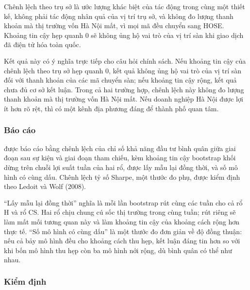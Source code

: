 Chênh lệch theo trụ sở là ước lượng khác biệt của tác động trong cùng một thiết kế, không phải tác động nhân quả của vị trí trụ sở, và không đo lượng thanh khoản mà thị trường vốn Hà Nội mất, vì mọi mã đều chuyển sang HOSE. Khoảng tin cậy hẹp quanh 0 sẽ không ủng hộ vai trò của vị trí sàn khi giao dịch đã điện tử hóa toàn quốc.

Kết quả này có ý nghĩa trực tiếp cho câu hỏi chính sách. Nếu khoảng tin cậy của chênh lệch theo trụ sở hẹp quanh 0, kết quả không ủng hộ vai trò của vị trí sàn đối với thanh khoản của các mã chuyển sàn; nếu khoảng tin cậy rộng, kết quả chưa đủ cơ sở kết luận. Trong cả hai trường hợp, chênh lệch này không đo lượng thanh khoản mà thị trường vốn Hà Nội mất. Nếu doanh nghiệp Hà Nội được lợi ít hơn rõ rệt, thì có một kênh địa phương đáng để thành phố quan tâm.

\subsubsection*{Báo cáo }

 được báo cáo bằng chênh lệch của chỉ số khả năng đầu tư bình quân giữa giai đoạn sau sự kiện và giai đoạn tham chiếu, kèm khoảng tin cậy bootstrap khối dừng trên chuỗi lợi suất tuần của hai rổ, được lấy mẫu lại đồng thời, và số mô hình có cùng dấu. Chênh lệch tỷ số Sharpe, một thước đo phụ, được kiểm định theo Ledoit và Wolf (2008).

\enquote{Lấy mẫu lại đồng thời} nghĩa là mỗi lần bootstrap rút cùng các tuần cho cả rổ H và rổ CS. Hai rổ chịu chung cú sốc thị trường trong cùng tuần; rút riêng sẽ làm mất mối tương quan này và làm khoảng tin cậy của khoảng cách rộng hơn thực tế. \enquote{Số mô hình có cùng dấu} là một thước đo đơn giản về độ đồng thuận: nếu cả bảy mô hình đều cho khoảng cách thu hẹp, kết luận đáng tin hơn so với khi bốn mô hình thu hẹp còn ba mô hình nới rộng, dù bình quân có thể như nhau.

\subsubsection*{Kiểm định }

